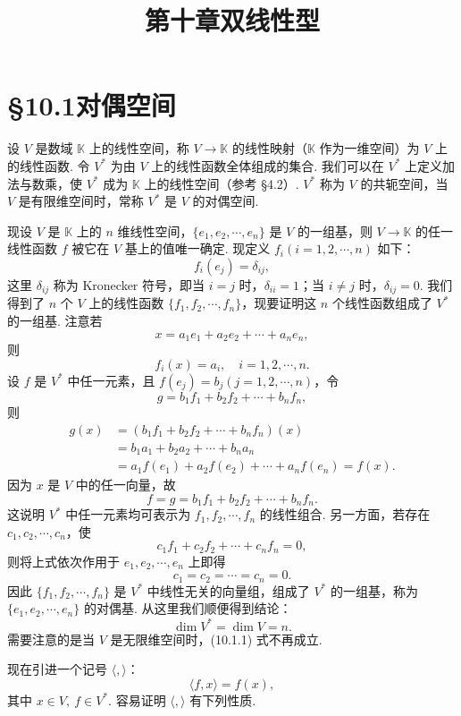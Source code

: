 \documentclass[UTF8, 12pt, fontset=fandol, oneside]{ctexart}
\title{第十章\quad 双线性型}
\author{}
\date{}
\begin{document}
\maketitle

\section*{§10.1\quad 对偶空间}

设 $V$ 是数域 $\mathbb K$ 上的线性空间，称 $V\to \mathbb K$ 的线性映射（$\mathbb K$ 作为一维空间）为 $V$ 上的线性函数. 令 $V^*$ 为由 $V$ 上的线性函数全体组成的集合. 我们可以在 $V^*$ 上定义加法与数乘，使 $V^*$ 成为 $\mathbb K$ 上的线性空间（参考 §4.2）. $V^*$ 称为 $V$ 的共轭空间，当 $V$ 是有限维空间时，常称 $V^*$ 是 $V$ 的对偶空间.

现设 $V$ 是 $\mathbb K$ 上的 $n$ 维线性空间，$\{e_1,e_2,\cdots,e_n\}$ 是 $V$ 的一组基，则 $V\to \mathbb K$ 的任一线性函数 $f$ 被它在 $V$ 基上的值唯一确定. 现定义 $f_i(i=1,2,\cdots,n)$ 如下：
\[
  f_i(e_j)=\delta_{ij},
\]
这里 $\delta_{ij}$ 称为 Kronecker 符号，即当 $i=j$ 时，$\delta_{ii}=1$；当 $i\ne j$ 时，$\delta_{ij}=0$. 我们得到了 $n$ 个 $V$ 上的线性函数 $\{f_1,f_2,\cdots,f_n\}$，现要证明这 $n$ 个线性函数组成了 $V^*$ 的一组基. 注意若
\[
  x=a_1e_1+a_2e_2+\cdots+a_ne_n,
\]
则
\[
  f_i(x)=a_i,\quad i=1,2,\cdots,n.
\]
设 $f$ 是 $V^*$ 中任一元素，且 $f(e_j)=b_j(j=1,2,\cdots,n)$，令
\[
  g=b_1f_1+b_2f_2+\cdots+b_nf_n,
\]
则
\[
\begin{aligned}
  g(x)&=(b_1f_1+b_2f_2+\cdots+b_nf_n)(x)\\
      &=b_1a_1+b_2a_2+\cdots+b_na_n\\
      &=a_1f(e_1)+a_2f(e_2)+\cdots+a_nf(e_n)=f(x).
\end{aligned}
\]
因为 $x$ 是 $V$ 中的任一向量，故
\[
  f=g=b_1f_1+b_2f_2+\cdots+b_nf_n.
\]
这说明 $V^*$ 中任一元素均可表示为 $f_1,f_2,\cdots,f_n$ 的线性组合. 另一方面，若存在 $c_1,c_2,\cdots,c_n$，使
\[
  c_1f_1+c_2f_2+\cdots+c_nf_n=0,
\]
则将上式依次作用于 $e_1,e_2,\cdots,e_n$ 上即得
\[
  c_1=c_2=\cdots=c_n=0.
\]
因此 $\{f_1,f_2,\cdots,f_n\}$ 是 $V^*$ 中线性无关的向量组，组成了 $V^*$ 的一组基，称为 $\{e_1,e_2,\cdots,e_n\}$ 的对偶基. 从这里我们顺便得到结论：
\begin{equation}
  \dim V^*=\dim V=n.
  \tag{10.1.1}
\end{equation}
需要注意的是当 $V$ 是无限维空间时，(10.1.1) 式不再成立.

现在引进一个记号 $\langle,\rangle$：
\[
  \langle f,x\rangle=f(x),
\]
其中 $x\in V,\ f\in V^*$. 容易证明 $\langle,\rangle$ 有下列性质.
\end{document}
